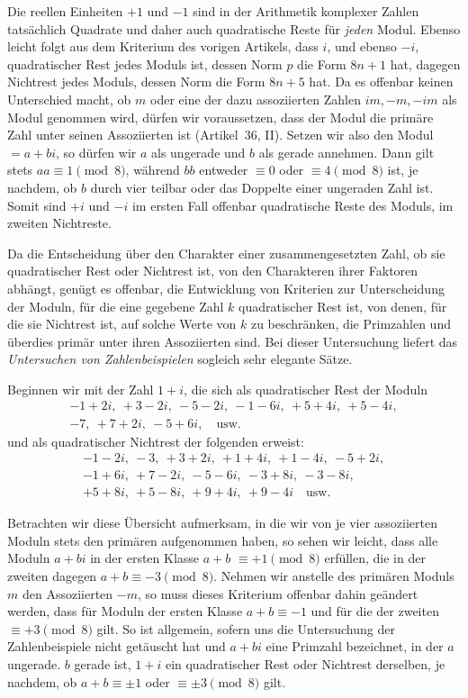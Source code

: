 Die reellen Einheiten $+1$ und $-1$ sind in der Arithmetik komplexer Zahlen tatsächlich Quadrate und daher auch quadratische Reste für \emph{jeden} Modul. Ebenso leicht folgt aus dem Kriterium des vorigen Artikels, dass $i$, und ebenso $-i$, quadratischer Rest jedes Moduls ist, dessen Norm $p$ die Form $8n+1$ hat, dagegen Nichtrest jedes Moduls, dessen Norm die Form $8n+5$ hat. Da es offenbar keinen Unterschied macht, ob $m$ oder eine der dazu assoziierten Zahlen $im,-m,-im$ als Modul genommen wird, dürfen wir voraussetzen, dass der Modul die primäre Zahl unter seinen Assoziierten ist (Artikel~36, II). Setzen wir also den Modul $=a+bi$, so dürfen wir $a$ als ungerade und $b$ als gerade annehmen. Dann gilt stets $aa\equiv1\pmod8$, während $bb$ entweder $\equiv0$ oder $\equiv4\pmod8$ ist, je nachdem, ob $b$ durch vier teilbar oder das Doppelte einer ungeraden Zahl ist. Somit sind $+i$ und $-i$ im ersten Fall offenbar quadratische Reste des Moduls, im zweiten Nichtreste.

%
Da die Entscheidung über den Charakter einer zusammengesetzten Zahl, ob sie quadratischer Rest oder Nichtrest ist, von den Charakteren ihrer Faktoren abhängt, genügt es offenbar, die Entwicklung von Kriterien zur Unterscheidung der Moduln, für die eine gegebene Zahl $k$ quadratischer Rest ist, von denen, für die sie Nichtrest ist, auf solche Werte von $k$ zu beschränken, die Primzahlen und überdies primär unter ihren Assoziierten sind. Bei dieser Untersuchung liefert das \emph{Untersuchen von Zahlenbeispielen} sogleich sehr elegante Sätze.

Beginnen wir mit der Zahl $1+i$, die sich als quadratischer Rest der Moduln
\[
\begin{gathered}
-1+2i,\ +3-2i,\ -5-2i,\ -1-6i,\ +5+4i,\ +5-4i,\\
-7,\ +7+2i,\ -5+6i,\quad\text{usw.}
\end{gathered}
\]
und als quadratischer Nichtrest der folgenden erweist:
\[
\begin{gathered}
-1-2i,\ -3,\ +3+2i,\ +1+4i,\ +1-4i,\ -5+2i,\\
-1+6i,\ +7-2i,\ -5-6i,\ -3+8i,\ -3-8i,\\
+5+8i,\ +5-8i,\ +9+4i,\ +9-4i\quad\text{usw.}
\end{gathered}
\]

Betrachten wir diese Übersicht aufmerksam, in die wir von je vier assoziierten Moduln stets den primären aufgenommen haben, so sehen wir leicht, dass alle Moduln $a+bi$ in der ersten Klasse $a+b$ $\equiv+1\pmod8$ erfüllen, die in der zweiten dagegen $a+b\equiv-3\pmod8$. Nehmen wir anstelle des primären Moduls $m$ den Assoziierten $-m$, so muss dieses Kriterium offenbar dahin geändert werden, dass für Moduln der ersten Klasse $a+b\equiv-1$ und für die der zweiten $\equiv+3\pmod8$ gilt. So ist allgemein, sofern uns die Untersuchung der Zahlenbeispiele nicht getäuscht hat und $a+bi$ eine Primzahl bezeichnet, in der $a$ ungerade. $b$ gerade ist, $1+i$ ein quadratischer Rest oder Nichtrest derselben, je nachdem, ob $a+b\equiv\pm1$ oder $\equiv\pm3\pmod8$ gilt.


